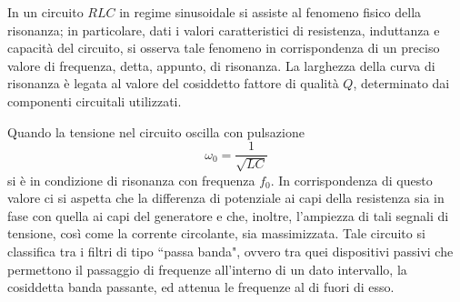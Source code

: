 In un circuito $RLC$ in regime sinusoidale si assiste al fenomeno fisico della risonanza; in particolare, dati i valori
caratteristici di resistenza, induttanza e capacità del circuito, si osserva tale fenomeno in corrispondenza di un preciso
valore di frequenza, detta, appunto, di risonanza.
La larghezza della curva di risonanza è legata al valore del cosiddetto
fattore di qualità $Q$, determinato dai componenti circuitali utilizzati.

Quando la tensione nel circuito oscilla con pulsazione
\begin{equation}\label{eq:res-pulsation}
    \omega_0 = \frac{1}{\sqrt{L C}}
\end{equation}
si è in condizione di risonanza con frequenza $f_0$.
In corrispondenza di questo valore ci si aspetta che la differenza di potenziale ai capi della
resistenza sia in fase con quella ai capi del generatore e che, inoltre, l'ampiezza di tali segnali
di tensione, così come la corrente circolante, sia massimizzata.
Tale circuito si classifica tra i filtri di tipo ``passa banda", ovvero tra quei dispositivi passivi che permettono il
passaggio di frequenze all'interno di un dato intervallo, la cosiddetta banda passante, ed attenua le frequenze al
di fuori di esso.